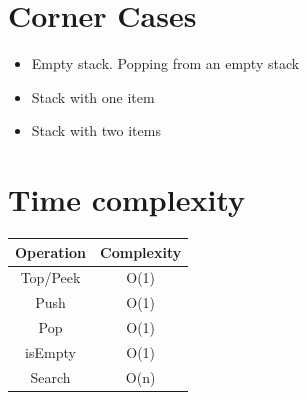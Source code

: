 	\section{Corner Cases}
		\begin{itemize}
			\item Empty stack. Popping from an empty stack
			\item Stack with one item
			\item Stack with two items
		\end{itemize}
		
	
	\section{Time complexity}
	
	\begin{center}
		\begin{tabular}{||c c||}
		\hline
		Operation & Complexity\\
		\hline\hline
		Top/Peek & O(1)\\
		\hline
		Push & O(1)\\
		\hline
		Pop & O(1)\\
		\hline
		isEmpty & O(1)\\
		\hline
		Search & O(n)\\
		\hline
			
		\end{tabular}
	\end{center}
	
	
	